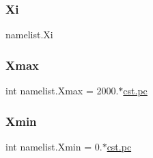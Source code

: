 \subsubsection{\texorpdfstring{Xi}{Xi}}
{\footnotesize\ttfamily namelist.\+Xi}

\mbox{\label{namespacenamelist_a9b5f75b28f87c2258e7f52b41cabcd8f}} 
\subsubsection{\texorpdfstring{Xmax}{Xmax}}
{\footnotesize\ttfamily int namelist.\+Xmax = 2000.$\ast$\hyperlink{constants_8h_a2884cd030c4c825754349a525a1d06ce}{cst.\+pc}}

\mbox{\label{namespacenamelist_a512ba0df866fdbf44bfdd6dab3846aba}} 
\subsubsection{\texorpdfstring{Xmin}{Xmin}}
{\footnotesize\ttfamily int namelist.\+Xmin = 0.$\ast$\hyperlink{constants_8h_a2884cd030c4c825754349a525a1d06ce}{cst.\+pc}}

